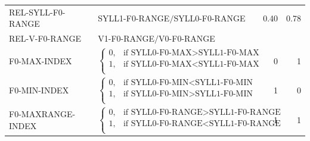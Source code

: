 \begin{table}[h!]
{\begin{subtable}[h]{\textwidth}
\begin{tabularx}{\textwidth}{p{}Xrr}
		REL-SYLL-F0-RANGE & SYLL1-F0-RANGE$/$SYLL0-F0-RANGE & 0.40%
																															& 0.78\\
																															REL-V-F0-RANGE & V1-F0-RANGE$/$V0-F0-RANGE &  \color{red}{TD}	& \color{red}{TD}\\
		F0-MAX-INDEX	
							& 	$\begin{cases} 
								0, & \text{if SYLL0-F0-MAX}>\text{SYLL1-F0-MAX}\\
								1, & \text{if SYLL0-F0-MAX}<\text{SYLL1-F0-MAX}\\
								\end{cases}$
																									& 0					& 1				\\
		F0-MIN-INDEX	
							& 	$\begin{cases} 
								0, & \text{if SYLL0-F0-MIN}<\text{SYLL1-F0-MIN}\\
								1, & \text{if SYLL0-F0-MIN}>\text{SYLL1-F0-MIN}\\
								\end{cases}$
																									& 1					& 0				\\
																									
		F0-MAXRANGE-INDEX	
					& $\begin{cases} 
								0, & \text{if SYLL0-F0-RANGE}>\text{SYLL1-F0-RANGE}\\
								1, & \text{if SYLL0-F0-RANGE}<\text{SYLL1-F0-RANGE}\\
							\end{cases}$
																									& 1					& 1				\\
		\bottomrule
		\end{tabularx}
		\end{subtable}
		
		} %
		\label{tab:durationfeatures}
\end{table}


